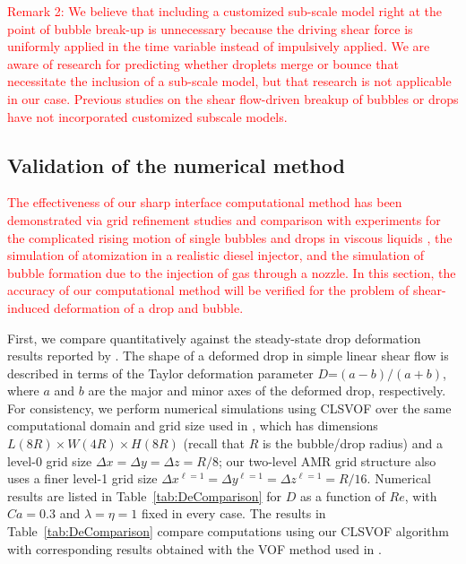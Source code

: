 \documentclass{elsarticle}
\newcommand{\lwh}[3]{L(#1R)\times W(#2R) \times H(#3R)}
\begin{document}
\par
\textcolor{red}
{
Remark 2: We believe that including a customized sub-scale model right at the point of bubble break-up is unnecessary because the driving shear force is uniformly applied in the time variable instead of impulsively applied.  We are aware of research for predicting whether droplets merge or bounce\cite{Lewin-Jones_Lockerby_Sprittles_2024} that necessitate the inclusion of a sub-scale model, but that research is not applicable in our case.  Previous studies on the shear flow-driven breakup of bubbles or drops have not incorporated customized subscale models\cite{LiRenRen00,KomShaEskDer14,AmaBalCasOli19}.
}

\subsection{Validation of the numerical method}
\textcolor{red}
{
	The effectiveness of our sharp interface computational method has been demonstrated via grid refinement studies and comparison with experiments for the complicated rising motion of single bubbles and drops in viscous liquids \citet{OhtSus12, OhtAkaYosSus14, OhtFurYosSus19,ohta2010sensitivity,stewart2008improved,SusSmiHusOhtZhi07,sussman2009stable}, the simulation of atomization in a realistic diesel injector\cite{arienti2013coupled}, and the simulation of bubble formation due to the injection of gas through a nozzle\cite{ohta2011robust}.  In this section, the accuracy of our computational method will be verified for the problem of shear-induced deformation of a drop and bubble. 
}
\par
       First, we compare quantitatively against the steady-state drop deformation results reported by \citet{LiRenRen00}.  The shape of a deformed drop in simple linear shear flow is described in terms of the Taylor deformation parameter $D$=$(a-b)/(a+b)$, where $a$ and $b$ are the major and minor axes of the deformed drop, respectively.  For consistency, we perform numerical simulations using CLSVOF over the same computational domain and grid size used in \citet{LiRenRen00}, which has dimensions $\lwh{8}{4}{8}$ (recall that $R$ is the bubble/drop radius) and a level-0 grid size $\Delta x=\Delta y=\Delta z=R/8$; our two-level AMR grid structure also uses a finer level-1 grid size $\Delta x^{\ell=1} = \Delta y^{\ell=1} = \Delta z^{\ell=1} = R/16$.  Numerical results are listed in Table~\ref{tab:DeComparison} for $D$ as a function of $Re$, with $Ca=0.3$ and $\lambda = \eta = 1$ fixed in every case.  The results in Table~\ref{tab:DeComparison} compare computations using our CLSVOF algorithm with corresponding results obtained with the VOF method used in \citet{LiRenRen00}.  
\end{document}
